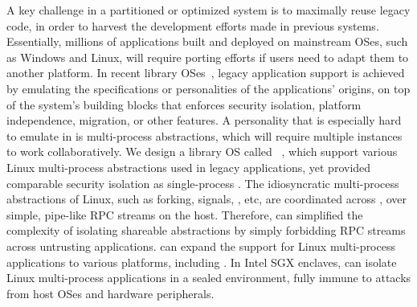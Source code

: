 A key challenge in a partitioned or optimized system is
to maximally reuse legacy code, %
in order to harvest the development efforts made in previous systems.
Essentially, millions of applications built and deployed
on mainstream OSes,
such as Windows and Linux,
will require porting efforts if users need to adapt them to another platform. 
In recent library OSes~\citep{porter11drawbridge, baumann13bascule, tsai14graphene, baumann14haven},
legacy application support is achieved
by emulating
the specifications or personalities of the applications' origins,
on top of the system's building blocks
that enforces security isolation, platform independence, migration, or other features.
A personality that is especially hard to emulate in \picoprocs{}
is multi-process abstractions,
which will require multiple \libos{} instances to work collaboratively. 
We design a library OS called \term{\graphene{}}~\citep{tsai14graphene},
which support various Linux multi-process abstractions used in legacy applications,
yet provided comparable security isolation
as single-process \picoprocs{}.
The idiosyncratic multi-process abstractions of Linux, such as forking, signals, \sysvipc{}, etc,
are coordinated across \picoprocs{},
over simple, pipe-like RPC streams on the host.
Therefore, \graphene{} can simplified the complexity of isolating shareable abstractions
by simply forbidding RPC streams across untrusting applications.
\graphene{} can expand the support for Linux multi-process applications
to various platforms, including .
In Intel SGX enclaves, \graphene{} can isolate Linux multi-process applications
in a sealed environment,
fully immune to 
attacks from host OSes and hardware peripherals.

